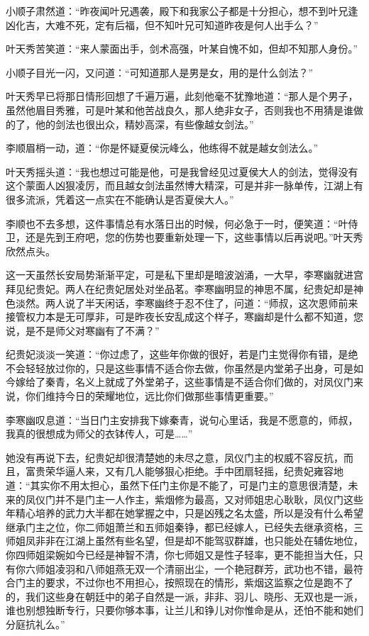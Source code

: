 小顺子肃然道：“昨夜闻叶兄遇袭，殿下和我家公子都是十分担心，想不到叶兄逢凶化吉，大难不死，定有后福，但不知叶兄可知道昨夜是何人出手么？”

叶天秀苦笑道：“来人蒙面出手，剑术高强，叶某自愧不如，但却不知那人身份。”

小顺子目光一闪，又问道：“可知道那人是男是女，用的是什么剑法？”

叶天秀早已将那日情形回想了千遍万遍，此刻他毫不犹豫地道：“那人是个男子，虽然他眉目秀雅，可是叶某和他苦战良久，那人绝非女子，否则我也不用猜是谁做的了，他的剑法也很出众，精妙高深，有些像越女剑法。”

李顺眉梢一动，道：“你是怀疑夏侯沅峰么，他练得不就是越女剑法么。”

叶天秀摇头道：“我也想过可能是他，可是我曾经见过夏侯大人的剑法，觉得没有这个蒙面人凶狠凌厉，而且越女剑法虽然博大精深，可是并非一脉单传，江湖上有很多流派，凭着这一点实在不能确认是否夏侯大人。”

李顺也不去多想，这件事情总有水落日出的时候，何必急于一时，便笑道：“叶侍卫，还是先到王府吧，您的伤势也要重新处理一下，这些事情以后再说吧。”叶天秀欣然点头。

这一天虽然长安局势渐渐平定，可是私下里却是暗波汹涌，一大早，李寒幽就进宫拜见纪贵妃。两人在纪贵妃居处对坐品茗。李寒幽明显的神思不属，纪贵妃却是神色淡然。两人说了半天闲话，李寒幽终于忍不住了，问道：“师叔，这次恩师前来接管权力本是无可厚非，可是昨夜长安乱成这个样子，寒幽却是什么都不知道，您说，是不是师父对寒幽有了不满？”

纪贵妃淡淡一笑道：“你过虑了，这些年你做的很好，若是门主觉得你有错，是绝不会轻轻放过你的，只是这些事情不适合你去做，你虽然是内堂弟子出身，可是如今嫁给了秦青，名义上就成了外堂弟子，这些事情是不适合你们做的，对凤仪门来说，你们维持今日的荣耀地位，远比你们做那些事情更重要。”

李寒幽叹息道：“当日门主安排我下嫁秦青，说句心里话，我是不愿意的，师叔，我真的很想成为师父的衣钵传人，可是……”

她没有再说下去，纪贵妃却很清楚她的未尽之意，凤仪门主的权威不容反抗，而且，富贵荣华逼人来，又有几人能够狠心拒绝。手中团扇轻摇，纪贵妃雍容地道：“其实你不用太担心，虽然下任门主你是不能了，可是门主的意思很清楚，未来的凤仪门并不是门主一人作主，紫烟修为最高，又对师姐忠心耿耿，凤仪门这些年精心培养的武力大半都在她掌握之中，只是凶残之名太盛，所以是没有什么希望继承门主之位，你二师姐萧兰和五师姐秦铮，都已经嫁人，已经失去继承资格，三师姐凤非非在江湖上虽然有些名望，但是却不能驾驭群雄，也只能处在辅佐地位，你四师姐梁婉如今已经是神智不清，你七师姐又是性子轻率，更不能担当大任，只有你六师姐凌羽和八师姐燕无双一个清丽出尘，一个艳冠群芳，武功也不错，最符合门主的要求，不过你也不用担心，按照现在的情形，紫烟这监察之位是跑不了的，我们这些身在朝廷中的弟子自然是一派，非非、羽儿、晓彤、无双也是一派，谁也别想独断专行，只要你够本事，让兰儿和铮儿对你惟命是从，还怕不能和她们分庭抗礼么。”

